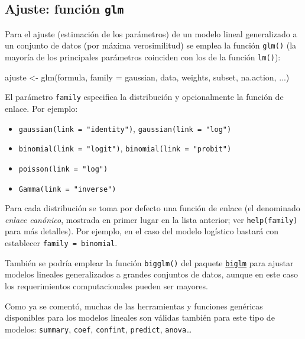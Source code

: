 \documentclass[
  spanish,
]{book}
\newenvironment{Shaded}{\begin{snugshade}}{\end{snugshade}}
\newcommand{\AttributeTok}[1]{\textcolor[rgb]{0.77,0.63,0.00}{#1}}
\newcommand{\FunctionTok}[1]{\textcolor[rgb]{0.00,0.00,0.00}{#1}}
\newcommand{\NormalTok}[1]{#1}
\newcommand{\OtherTok}[1]{\textcolor[rgb]{0.56,0.35,0.01}{#1}}
\theoremstyle{break}
\theoremstyle{definition}
\theoremstyle{definition}
\theoremstyle{definition}
\theoremstyle{definition}
\theoremstyle{remark}
\begin{document}
\hypertarget{ajuste-funciuxf3n-glm}{%
\subsection{\texorpdfstring{Ajuste: función \texttt{glm}}{Ajuste: función glm}}\label{ajuste-funciuxf3n-glm}}

Para el ajuste (estimación de los parámetros) de un modelo lineal generalizado a un conjunto de datos (por máxima verosimilitud) se emplea la función \texttt{glm()} (la mayoría de los principales parámetros coinciden con los de la función \texttt{lm()}):

\begin{Shaded}
\begin{Highlighting}[]
\NormalTok{ajuste }\OtherTok{\textless{}{-}} \FunctionTok{glm}\NormalTok{(formula, }\AttributeTok{family =}\NormalTok{ gaussian, data, weights, subset, na.action, ...)}
\end{Highlighting}
\end{Shaded}

El parámetro \texttt{family} especifica la distribución y opcionalmente la función de enlace.
Por ejemplo:

\begin{itemize}
\item
  \texttt{gaussian(link\ =\ "identity")}, \texttt{gaussian(link\ =\ "log")}
\item
  \texttt{binomial(link\ =\ "logit")}, \texttt{binomial(link\ =\ "probit")}
\item
  \texttt{poisson(link\ =\ "log")}
\item
  \texttt{Gamma(link\ =\ "inverse")}
\end{itemize}

Para cada distribución se toma por defecto una función de enlace (el denominado \emph{enlace canónico}, mostrada en primer lugar en la lista anterior; ver \texttt{help(family)} para más detalles).
Por ejemplo, en el caso del modelo logístico bastará con establecer \texttt{family\ =\ binomial}.

También se podría emplear la función \texttt{bigglm()} del paquete \href{https://CRAN.R-project.org/package=biglm}{\texttt{biglm}} para ajustar modelos lineales generalizados a grandes conjuntos de datos, aunque en este caso los requerimientos computacionales pueden ser mayores.

Como ya se comentó, muchas de las herramientas y funciones genéricas disponibles para los modelos lineales son válidas también para este tipo de modelos: \texttt{summary}, \texttt{coef}, \texttt{confint}, \texttt{predict}, \texttt{anova}\ldots{}
\end{document}
